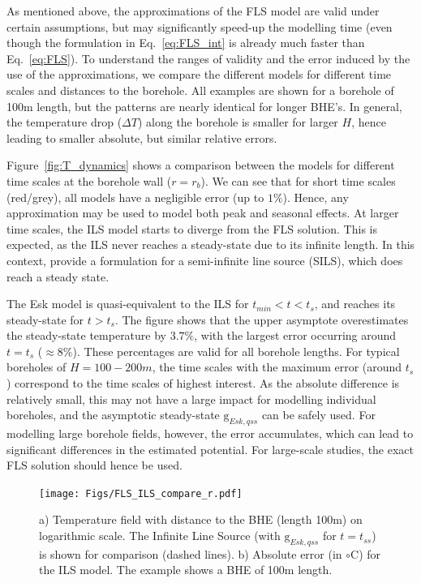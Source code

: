 As mentioned above, the approximations of the FLS model are valid under certain assumptions, but may significantly speed-up the modelling time (even though the formulation in Eq.~\ref{eq:FLS_int} is already much faster than Eq.~\ref{eq:FLS}). To understand the ranges of validity and the error induced by the use of the approximations, we compare the different models for different time scales and distances to the borehole. All examples are shown for a borehole of 100m length, but the patterns are nearly identical for longer BHE's. In general, the temperature drop ($\Delta T$) along the borehole is smaller for larger $H$, hence leading to smaller absolute, but similar relative errors. 

Figure~\ref{fig:T_dynamics} shows a comparison between the models for different time scales at the borehole wall ($r = r_b$). We can see that for short time scales (red/grey), all models have a negligible error (up to $1\%$). 
Hence, any approximation may be used to model both peak and seasonal effects. At larger time scales, the ILS model starts to diverge from the FLS solution. 
This is expected, as the ILS never reaches a steady-state due to its infinite length. In this context, \citet{bandos_finite_2009} provide a formulation for a semi-infinite line source (SILS), which does reach a steady state. 

The Esk model is quasi-equivalent to the ILS for $t_{min} < t < t_s$, and reaches its steady-state for $t > t_s$. The figure shows that the upper asymptote overestimates the steady-state temperature by $3.7\%$, with the largest error occurring around $t = t_s$ ($\approx 8\%$). These percentages are valid for all borehole lengths. 
For typical boreholes of $H=100-200m$, the time scales with the maximum error (around $t_s$) correspond to the time scales of highest interest. 
As the absolute difference is relatively small, this may not have a large impact for modelling individual boreholes, and the asymptotic steady-state $\mathrm{g}_{Esk, qss}$ can be safely used. For modelling large borehole fields, however, the error accumulates, which can lead to significant differences in the estimated potential. For large-scale studies, the exact FLS solution should hence be used.

\begin{figure}[t]
    \centering
    \texttt{[image: Figs/FLS\_ILS\_compare\_r.pdf]}
    \caption{a) Temperature field with distance to the BHE (length 100m) on logarithmic scale. The Infinite Line Source (with $\mathrm{g}_{Esk, qss}$ for $t = t_{ss}$) is shown for comparison (dashed lines). b) Absolute error (in $\circ$C) for the ILS model. The example shows a BHE of 100m length.}
    \label{fig:r_field}
\end{figure}

